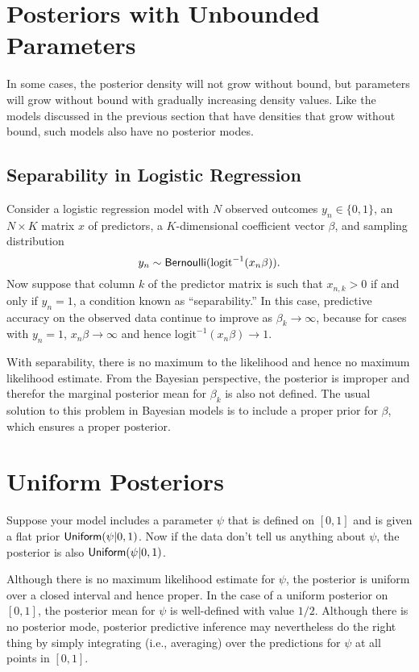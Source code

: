 \section{Posteriors with Unbounded Parameters}

In some cases, the posterior density will not grow without bound, but
parameters will grow without bound with gradually increasing density
values.  Like the models discussed in the previous section that have
densities that grow without bound, such models also have no posterior
modes.


\subsection{Separability in Logistic Regression}

Consider a logistic regression model with $N$ observed outcomes $y_n
\in \{ 0, 1 \}$, an $N \times K$ matrix $x$ of predictors, a
$K$-dimensional coefficient vector $\beta$, and sampling distribution
\[
y_n \sim \mbox{\sf Bernoulli}(\mbox{logit}^{-1}(x_n \beta)).
\]
Now suppose that column $k$ of the predictor matrix is such that
$x_{n,k} > 0$ if and only if $y_n = 1$, a condition known as
``separability.''  In this case, predictive accuracy on the observed data
continue to improve as $\beta_k \rightarrow \infty$, because for cases
with $y_n = 1$, $x_n \beta \rightarrow \infty$ and hence
$\mbox{logit}^{-1}(x_n \beta) \rightarrow 1$.  

With separability, there is no maximum to the likelihood and hence no
maximum likelihood estimate.  From the Bayesian perspective, the
posterior is improper and therefor the marginal posterior mean for
$\beta_k$ is also not defined.  The usual solution to this problem in
Bayesian models is to include a proper prior for $\beta$, which
ensures a proper posterior.


\section{Uniform Posteriors}

Suppose your model includes a parameter $\psi$ that is defined on
$[0,1]$ and is given a flat prior $\mbox{\sf Uniform}(\psi|0,1)$. Now if
the data don't tell us anything about $\psi$, the posterior is also
$\mbox{\sf Uniform}(\psi|0,1)$.

Although there is no maximum likelihood estimate for $\psi$, the
posterior is uniform over a closed interval and hence proper.  In the
case of a uniform posterior on $[0,1]$, the posterior mean for $\psi$
is well-defined with value $1/2$.  Although there is no posterior
mode, posterior predictive inference may nevertheless do the right
thing by simply integrating (i.e., averaging) over the predictions for
$\psi$ at all points in $[0,1]$.


